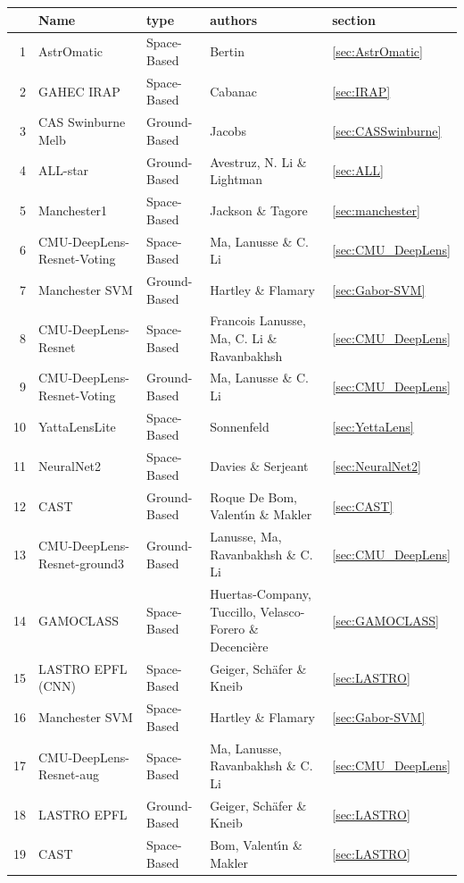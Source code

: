 \documentclass{aa}
\begin{document}
\begin{table}
\centering
\begin{tabular}{rllll}
  \hline
 & Name & type & authors & section \\ 
  \hline
  1 & AstrOmatic & Space-Based & Bertin  & \ref{sec:AstrOmatic}  \\ 
  2 & GAHEC IRAP & Space-Based & Cabanac & \ref{sec:IRAP} \\ 
  3 & CAS Swinburne Melb & Ground-Based & Jacobs   & \ref{sec:CASSwinburne} \\ 
  4 & ALL-star & Ground-Based & Avestruz, N. Li \& Lightman  & \ref{sec:ALL} \\ 
  5 & Manchester1 & Space-Based & Jackson \& Tagore  & \ref{sec:manchester} \\ 
  6 & CMU-DeepLens-Resnet-Voting & Space-Based & Ma, Lanusse \& C. Li  & \ref{sec:CMU_DeepLens} \\ 
  7 & Manchester SVM & Ground-Based & Hartley \& Flamary  & \ref{sec:Gabor-SVM} \\ 
  8 & CMU-DeepLens-Resnet & Space-Based & Francois Lanusse, Ma, C. Li \& Ravanbakhsh  & \ref{sec:CMU_DeepLens} \\ 
  9 & CMU-DeepLens-Resnet-Voting & Ground-Based & Ma, Lanusse \& C. Li  & \ref{sec:CMU_DeepLens} \\ 
  10 & YattaLensLite & Space-Based &  Sonnenfeld  & \ref{sec:YettaLens} \\ 
  11 & NeuralNet2 & Space-Based &  Davies \& Serjeant & \ref{sec:NeuralNet2} \\ 
  12 & CAST & Ground-Based &  Roque De Bom, Valent\'{\i}n \&  Makler  & \ref{sec:CAST} \\ 
  13 & CMU-DeepLens-Resnet-ground3 & Ground-Based &  Lanusse, Ma, Ravanbakhsh \& C. Li  & \ref{sec:CMU_DeepLens} \\ 
  14 & GAMOCLASS & Space-Based &  Huertas-Company, Tuccillo, Velasco-Forero \& Decenci\`{e}re & \ref{sec:GAMOCLASS} \\ 
  15 & LASTRO EPFL (CNN) & Space-Based & Geiger, Sch\"{a}fer \& Kneib  & \ref{sec:LASTRO} \\ 
  16 & Manchester SVM & Space-Based &  Hartley  \& Flamary & \ref{sec:Gabor-SVM} \\ 
  17 & CMU-DeepLens-Resnet-aug & Space-Based & Ma,  Lanusse, Ravanbakhsh \& C. Li  & \ref{sec:CMU_DeepLens} \\ 
  18 & LASTRO EPFL & Ground-Based & Geiger, Sch\"{a}fer \& Kneib  & \ref{sec:LASTRO} \\ 
  19 & CAST & Space-Based & Bom, Valent\'{\i}n \& Makler  & \ref{sec:LASTRO} \\ 

\end{tabular}
\end{table}
\end{document}
